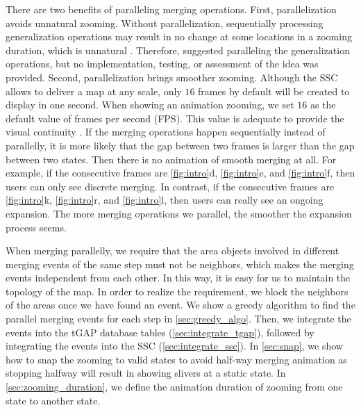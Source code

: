 \documentclass[]{interact}
\begin{document}
There are two benefits of paralleling merging operations.
First, parallelization avoids unnatural zooming.
Without parallelization,
sequentially processing generalization operations 
may result in no change at some locations in a zooming duration, 
which is unnatural \citep{vanOosterom2014Support}. 
Therefore, \citet{vanOosterom2014Support} 
suggested paralleling the generalization operations,
but no implementation, testing, or assessment of the idea was provided.
Second, parallelization brings smoother zooming.
Although the SSC allows to deliver a map at any scale,
only $16$ frames by default will be created to display in one second.
When showing an animation zooming, 
we set $16$ as the default value of frames per second (FPS).
This value is adequate to provide the visual continuity
\citep[]{Read2000Film}.
If the merging operations happen sequentially instead of parallelly,
it is more likely that
the gap between two frames is larger than the gap between two states.
Then there is no animation of smooth merging at all.
For example, if the consecutive frames are 
\figs\ref{fig:intro}d, \ref{fig:intro}e, and \ref{fig:intro}f,
then users can only see discrete merging.
In contrast, if the consecutive frames are 
\figs\ref{fig:intro}k, \ref{fig:intro}r, and \ref{fig:intro}l,
then users can really see an ongoing expansion. 
The more merging operations we parallel, 
the smoother the expansion process seems.


When merging parallelly,
we require that 
the area objects involved in different merging events of the same step 
must not be neighbors, 
which makes the merging events independent from each other.
In this way, it is easy for us to maintain the topology of the map.
In order to realize the requirement,
we block the neighbors of the areas once we have found an event.
We show a greedy algorithm to find the parallel merging events for each step
in \sect\ref{sec:greedy_algo}.
Then, we integrate the events into the tGAP database tables
(\sect\ref{sec:integrate_tgap}),
followed by integrating the events into the SSC 
(\sect\ref{sec:integrate_ssc}).
In \sect\ref{sec:snap}, we show how to snap the zooming to valid states
to avoid half-way merging animation 
as stopping halfway will result in showing slivers at a static state.
In \sect\ref{sec:zooming_duration}, we define 
the animation duration of zooming from one state to another state.
\end{document}
